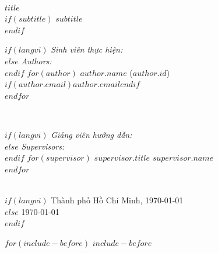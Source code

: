 \documentclass[a4paper, 12pt]{article}
\begin{document}
\begin{titlepage}
\HRule \\[0.4cm]
{\huge \bfseries $title$}\\[0.4cm] %
$if(subtitle)$
{\Large \bfseries $subtitle$}\\[0.4cm] %
$endif$
\HRule \\[1.5cm]

\begin{minipage}{0.4\textwidth}
\begin{flushleft} \large
$if(langvi)$
\emph{Sinh viên thực hiện:}\\
$else$
\emph{Authors:}\\
$endif$
$for(author)$
$author.name$ ($author.id$)\\
$if(author.email)$$author.email$$endif$\\
$endfor$
\end{flushleft}
\end{minipage}
~
\begin{minipage}{0.4\textwidth}
\begin{flushright} \large
$if(langvi)$
\emph{Giảng viên hướng dẫn:} \\
$else$
\emph{Supervisors:} \\
$endif$
$for(supervisor)$
$supervisor.title$ $supervisor.name$ \\
$endfor$
\end{flushright}
\end{minipage}\\[2cm]

$if(langvi)$
{\large Thành phố Hồ Chí Minh, \today}\\[2cm] %
$else$
{\large \today}\\[2cm] %
$endif$

\vfill %
\end{titlepage}

$for(include-before)$
$include-before$
\end{document}
